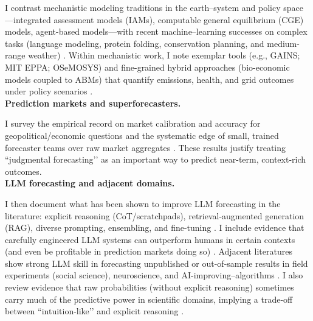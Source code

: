 \documentclass[12pt,a4paper]{article}
\let\citep\parencite
\begin{document}
I contrast mechanistic modeling traditions in the earth–system and policy space—integrated assessment models (IAMs), computable general equilibrium (CGE) models, agent-based models—with recent machine–learning successes on complex tasks (language modeling, protein folding, conservation planning, and medium-range weather) \citep{brownLanguageModelsAre2020,jumperHighlyAccurateProtein2021,silvestroImprovingBiodiversityProtection2022,lamLearningSkillfulMediumrange2023}. Within mechanistic work, I note exemplar tools (e.g., GAINS; MIT EPPA; OSeMOSYS) and fine-grained hybrid approaches (bio-economic models coupled to ABMs) that quantify emissions, health, and grid outcomes under policy scenarios \citep{CosteffectiveControlAir2011,MITEmissionsPrediction,OSeMOSYSOpenSource2011,dueriModelingImplicationsPolicy2024}.\\



\textbf{Prediction markets and superforecasters.}

I survey the empirical record on market calibration and accuracy for geopolitical/economic questions and the systematic edge of small, trained forecaster teams over raw market aggregates \citep{tetlockSuperforecastingArtScience2015,hansonShallWeVote2013,mellersIdentifyingCultivatingSuperforecasters2015}. These results justify treating ``judgmental forecasting’’ as an important way to predict near-term, context-rich outcomes.\\



\textbf{LLM forecasting and adjacent domains.}

I then document what has been shown to improve LLM forecasting in the literature: explicit reasoning (CoT/scratchpads), retrieval-augmented generation (RAG), diverse prompting, ensembling, and fine-tuning \citep{halawiApproachingHumanLevelForecasting2024,yanq.serajr.hej.mengl.andsylvaint.AutoCastEnhancingWorld2024,abolghasemiHumansVsLarge2025,schoeneggerLargeLanguageModel2023}. I include evidence that carefully engineered LLM systems can outperform humans in certain contexts (and even be profitable in prediction markets doing so) \citep{turtelLLMsCanTeach2025} \citep{halawiApproachingHumanLevelForecasting2024}. Adjacent literatures show strong LLM skill in forecasting unpublished or out-of-sample results in field experiments (social science), neuroscience, and AI-improving–algorithms \citep{chenPredictingFieldExperiments2025,hewittPredictingResultsSocial,xLargeLanguageModels2025,ghasemlooInformedForecastingLeveraging2025,wenPredictingEmpiricalAI2025}. I also review evidence that raw probabilities (without explicit reasoning) sometimes carry much of the predictive power in scientific domains, implying a trade-off between ``intuition-like’’ and explicit reasoning \citep{xLargeLanguageModels2025}.\\
\end{document}
